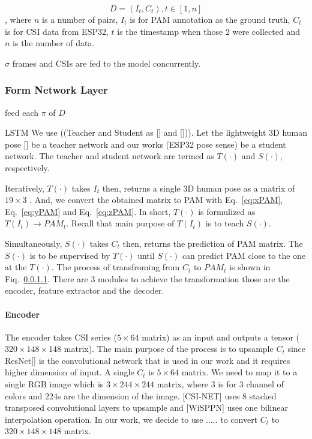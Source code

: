 \documentclass[conference]{IEEEtran}
\begin{document}
	\begin{equation}
	D =  {(I_t, C_t), t \in [1, n]}
	\label{eq:Dataset}
	\end{equation}, where  $n$ is a number of pairs, $I_t$ is for PAM annotation as the ground truth, $C_t$ is for CSI data from ESP32, $t$ is the timestamp when those 2 were collected and $n$ is the number of data.
	
	$\sigma$ frames and CSIs are fed to the model concurrently. 
	
	\subsubsection{Form Network Layer}
	
	feed each $\pi$ of $D$
	
	
	LSTM
	\iffalse
	  We use ((Teacher and Student as [] and [])). Let the lightweight 3D human pose [] be a teacher network and our works (ESP32 pose sense) be a student network. The teacher and student network are termed as $T(·)$ and $S(·)$, respectively. 
	  
	  Iteratively, $T(·)$ takes $I_t$ then, returns a single 3D human pose as a matrix of $19 \times 3$ . And, we convert the obtained matrix to PAM with Eq.~\ref{eq:xPAM}, Eq.~\ref{eq:yPAM} and Eq.~\ref{eq:zPAM}. In short, $T(·)$ is formulized  as $T(I_t) \rightarrow PAM_t$. Recall that main purpose of $T(I_t)$ is to teach $S(·)$.
	 
	 Simultaneously, $S(·)$ takes $C_t$  then, returns the  prediction of PAM matrix.
	 The $S(·)$ is to be supervised by $T(·)$ until $S(·)$ can predict PAM close to the one at the $T(·)$. The process of transfroming from $C_t$ to $PAM_t$ is shown in Fiq.~\ref{}. There are 3 modules to achieve the transformation those are the encoder, feature extractor and the decoder.
	 
	 
	 	\paragraph{Encoder}
	 	The encoder takes CSI series ($5\times64$ matrix) as an input and outputs a tensor ($320\times148\times148$  matrix). The main purpose of the process is to upsample $C_t$ since ResNet[] is the convolutional network that is used in our work and it requires higher dimension of input. A single $C_t$ is 
	 	$5\times64$ matrix. We need to map it to a single RGB image which is $3\times244\times244$ matrix, where 3 is for 3 channel of colors and 224s are the dimension of the image. [CSI-NET] uses 8 stacked transposed convolutional layers to upsample and [WiSPPN] uses one
	 	bilinear interpolation operation. In our work, we decide to use ..... to convert $C_t$ to $320\times148\times148$  matrix.
	 	
\end{document}
